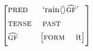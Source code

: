 \documentclass[12pt]{article}
\begin{document}
\begin{preview}
{
$$
\begin{bmatrix*}[l]
\vspace{1.5mm}
\text{\textsc{pred}} & \phantom{.} \text{`rain$\langle$$\rangle$$\widehat{\text{\textsc{gf}}}$'}\\
\vspace{1.5mm}
\text{\textsc{tense}} & \phantom{.} \text{\textsc{past}}\\
\vspace{1.5mm}
\text{$\widehat{\text{\textsc{gf}}}$} &
\begin{bmatrix*}[l]
\text{\textsc{form}} & \phantom{.} \text{it}\\
\end{bmatrix*}\\
\end{bmatrix*}\\
$$}
\end{preview}
\end{document}
